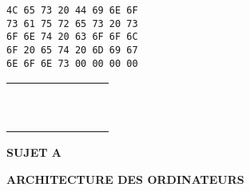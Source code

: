 \documentclass[11pt,a4paper]{article}
\newcommand{\TitreMatiere}{Architecture des Ordinateurs}
\begin{document}
\medskip

\begin{table}[ht!]
  \centering
  \begin{minipage}{0.4\textwidth}
    \centering
\begin{lstlisting}[style=algorithmique]
4C 65 73 20 44 69 6E 6F
73 61 75 72 65 73 20 73
6F 6E 74 20 63 6F 6F 6C
6F 20 65 74 20 6D 69 67
6E 6F 6E 73 00 00 00 00
\end{lstlisting}
  \end{minipage}
  \hfillx
  \begin{minipage}{0.45\textwidth}
    \centering

%
%
%
%
%
%
%

\begin{tabular}{ | m{0.45cm} | m{0.45cm} | m{0.45cm} | m{0.45cm}   |   m{0.45cm} | m{0.45cm} | m{0.45cm} | m{0.45cm} | }
\hline
 & & &   &   & & & \\
 & & &   &   & & & \\
\hline
 & & &   &   & & & \\
 & & &   &   & & & \\
\hline
 & & &   &   & & & \\
 & & &   &   & & & \\
\hline
 & & &   &   & & & \\
 & & &   &   & & & \\
\hline
 & & &   &   & & & \\
 & & &   &   & & & \\
\hline
\end{tabular}

  \end{minipage}
\end{table}



%
%

\newpage



\vfillFirst

\begin{center}

\begin{LARGE}
\textbf{SUJET A}

\bigskip

\textbf{\MakeUppercase{\TitreMatiere}}
\end{LARGE}

\end{center}

\vfillLast
\end{document}
